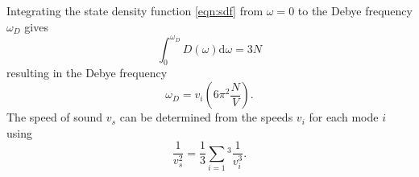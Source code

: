 Integrating the state density function \eqref{eqn:sdf} from 
$\omega=0$ to the Debye frequency $\omega_D$ gives
\begin{equation}
    \int_0^{\omega_D}D(\omega)\text{d}\omega=3N
\end{equation}
resulting in the Debye frequency
\begin{equation}
    \omega_D=v_i\left(6\pi^2\frac{N}{V}\right).
\end{equation}
The speed of sound $v_s$ can be determined from the speeds $v_i$ for each mode $i$ using
\begin{equation}
    \frac{1}{v_s^2}=\frac{1}{3}\sum_{i=1}{^3}\frac{1}{v_i^3}.
\end{equation}
